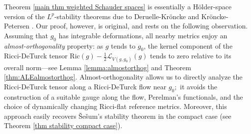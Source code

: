 \documentclass[12pt]{amsart}
\renewcommand{\1}{{\mathbf 1}}
\newcommand{\Ric}{\mathrm{Ric}}
\theoremstyle{others}
\numberwithin{equation}{section}
\begin{document}
Theorem \ref{main thm weighted Schauder spaces} is essentially a H{\"o}lder-space version of the $L^p$-stability theorems due to Deruelle-Kr{\"o}ncke \cite{DeruelleKroncke20} and Kr{\"o}ncke-Petersen \cite{KronckePetersen20}. Our proof, however, is original, and rests on the following observation. Assuming that $g_0$ has integrable deformations, all nearby metrics enjoy an \emph{almost-orthogonality} property: as $g$ tends to $g_0$, the kernel component of the Ricci-DeTurck tensor $\Ric(g) - \frac12 \mathcal L_{V(g, g_0)} (g)$ tends to zero relative to its overall norm---see Lemma \ref{lemma:almostorthog} and Theorem \ref{thm:ALEalmostorthog}.
Almost-orthogonality allows us to directly analyze the Ricci-DeTurck tensor along a Ricci-DeTurck flow near $g_0;$ %
it avoids the construction of a suitable gauge along the flow, Perelman's functionals, and the choice of dynamically changing Ricci-flat reference metrics. %
Moreover, this approach easily recovers {\v S}e{\v s}um's stability theorem \cite{Sesum06} in the compact case (see Theorem \ref{thm stability compact case}).
\end{document}
